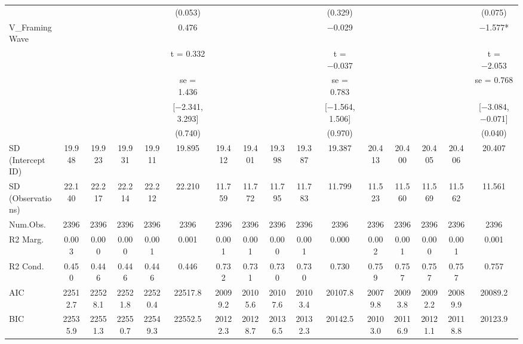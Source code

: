 \documentclass[]{report}
\begin{document}
\begin{table}
{\begin{tabular}[t]{lccccccccccccccc}
		&  &  &  &  & (\num{0.053}) &  &  &  &  & (\num{0.329}) &  &  &  &  & (\num{0.075})\\
		V\_FramingWave &  &  &  &  & \num{0.476} &  &  &  &  & \num{-0.029} &  &  &  &  & \num{-1.577}*\\
		&  &  &  &  & t = \num{0.332} &  &  &  &  & t = \num{-0.037} &  &  &  &  & t = \num{-2.053}\\
		&  &  &  &  & se = \num{1.436} &  &  &  &  & se = \num{0.783} &  &  &  &  & se = \num{0.768}\\
		&  &  &  &  & {}[\num{-2.341}, \num{3.293}] &  &  &  &  & {}[\num{-1.564}, \num{1.506}] &  &  &  &  & {}[\num{-3.084}, \num{-0.071}]\\
		&  &  &  &  & (\num{0.740}) &  &  &  &  & (\num{0.970}) &  &  &  &  & (\num{0.040})\\
		SD (Intercept ID) & \num{19.948} & \num{19.923} & \num{19.931} & \num{19.911} & \num{19.895} & \num{19.412} & \num{19.401} & \num{19.398} & \num{19.387} & \num{19.387} & \num{20.413} & \num{20.400} & \num{20.405} & \num{20.406} & \num{20.407}\\
		SD (Observations) & \num{22.140} & \num{22.217} & \num{22.214} & \num{22.212} & \num{22.210} & \num{11.759} & \num{11.772} & \num{11.795} & \num{11.783} & \num{11.799} & \num{11.523} & \num{11.560} & \num{11.569} & \num{11.562} & \num{11.561}\\
		\midrule
		Num.Obs. & \num{2396} & \num{2396} & \num{2396} & \num{2396} & \num{2396} & \num{2396} & \num{2396} & \num{2396} & \num{2396} & \num{2396} & \num{2396} & \num{2396} & \num{2396} & \num{2396} & \num{2396}\\
		R2 Marg. & \num{0.003} & \num{0.000} & \num{0.000} & \num{0.001} & \num{0.001} & \num{0.001} & \num{0.001} & \num{0.000} & \num{0.001} & \num{0.000} & \num{0.002} & \num{0.001} & \num{0.000} & \num{0.001} & \num{0.001}\\
		R2 Cond. & \num{0.450} & \num{0.446} & \num{0.446} & \num{0.446} & \num{0.446} & \num{0.732} & \num{0.731} & \num{0.730} & \num{0.730} & \num{0.730} & \num{0.759} & \num{0.757} & \num{0.757} & \num{0.757} & \num{0.757}\\
		AIC & \num{22512.7} & \num{22528.1} & \num{22521.8} & \num{22520.4} & \num{22517.8} & \num{20099.2} & \num{20105.6} & \num{20107.6} & \num{20103.4} & \num{20107.8} & \num{20079.8} & \num{20093.8} & \num{20092.2} & \num{20089.9} & \num{20089.2}\\
		BIC & \num{22535.9} & \num{22551.3} & \num{22550.7} & \num{22549.3} & \num{22552.5} & \num{20122.3} & \num{20128.7} & \num{20136.5} & \num{20132.3} & \num{20142.5} & \num{20103.0} & \num{20116.9} & \num{20121.1} & \num{20118.8} & \num{20123.9}\\

\end{tabular}}
\end{table}
\end{document}
